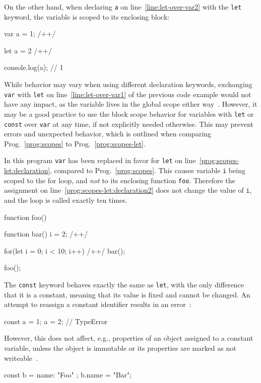 \noindent
On the other hand, when declaring \texttt{a} on line~\ref{line:let-over-var2} with the \texttt{let} keyword, the variable is scoped to its enclosing block:
\begin{JsCode}
var a = 1; /+\label{line:let-over-var1}+/

{
  let a = 2 /+\label{line:let-over-var2}+/
}

console.log(a); // 1
\end{JsCode}
While behavior may vary when using different declaration keywords, exchanging \texttt{var} with \texttt{let} on line~\ref{line:let-over-var1} of the previous code example would not have any impact, as the variable lives in the global scope either way~\cites{variable-scope:Microsoft:2017, var:MDN:2017}. However, it may be a good practice to use the block scope behavior for variables with \texttt{let} or \texttt{const} over \texttt{var} at any time, if not explicitly needed otherwise. This may prevent errors and unexpected behavior, which is outlined when comparing Prog.~\ref{prog:scopes} to Prog.~\ref{prog:scopes-let}.
\begin{program}[h]
\caption{In this program \texttt{var} has been replaced in favor for \texttt{let} on line~\ref{prog:scopes-let:declaration}, compared to Prog.~\ref{prog:scopes}. This causes variable \texttt{i} being scoped to the for loop, and \emph{not} to its enclosing function \texttt{foo}. Therefore the assignment on line~\ref{prog:scopes-let:declaration2} does not change the value of \texttt{i}, and the loop is called exactly ten times.}
\label{prog:scopes-let}
\begin{JsCode}
function foo() {

  function bar() {
    i = 2; /+\label{prog:scopes-let:declaration2}+/
  }
  
  for(let i = 0; i < 10; i++) { /+\label{prog:scopes-let:declaration}+/
    bar();
  }
  
}

foo();
\end{JsCode}
\end{program}

\enlargethispage{2\baselineskip}

\noindent
The \texttt{const} keyword behaves exactly the same as \texttt{let}, with the only difference that it is a constant, meaning that its value is fixed and cannot be changed. An attempt to reassign a constant identifier results in an error~\cite[p.~39]{YDKJS:ScopesAndClosures:Simpson:2014}:
\begin{JsCode}[numbers=none]
const a = 1;
a = 2; // TypeError
\end{JsCode}
However, this does not affect, e.g., properties of an object assigned to a constant variable, unless the object is immutable or its properties are marked as not writeable~\cite{const:MDN:2017}.
\begin{JsCode}[numbers=none]
const b = { name: "Foo" };
b.name = "Bar";
\end{JsCode}

